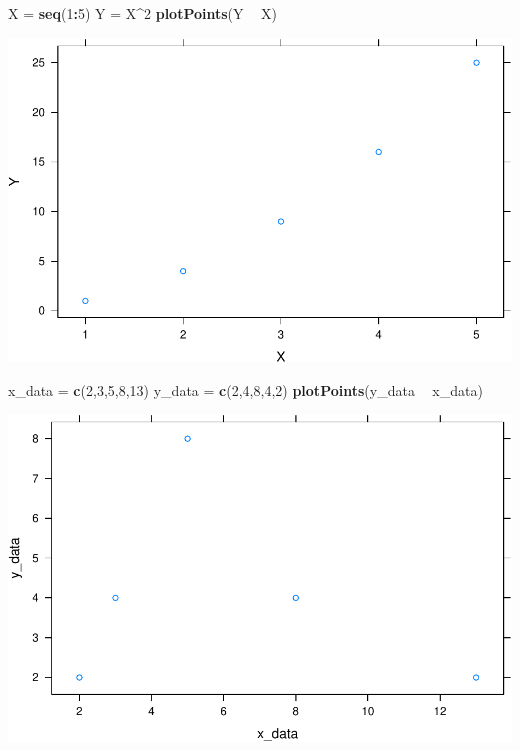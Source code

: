 \documentclass[
]{book}
\newenvironment{Shaded}{\begin{snugshade}}{\end{snugshade}}
\newcommand{\DecValTok}[1]{\textcolor[rgb]{0.00,0.00,0.81}{#1}}
\newcommand{\KeywordTok}[1]{\textcolor[rgb]{0.13,0.29,0.53}{\textbf{#1}}}
\newcommand{\NormalTok}[1]{#1}
\newcommand{\OperatorTok}[1]{\textcolor[rgb]{0.81,0.36,0.00}{\textbf{#1}}}
\newcommand{\StringTok}[1]{\textcolor[rgb]{0.31,0.60,0.02}{#1}}
\begin{document}
\begin{Shaded}
\begin{Highlighting}[]
\NormalTok{X =}\StringTok{ }\KeywordTok{seq}\NormalTok{(}\DecValTok{1}\OperatorTok{:}\DecValTok{5}\NormalTok{)}
\NormalTok{Y =}\StringTok{ }\NormalTok{X}\OperatorTok{^}\DecValTok{2}
\KeywordTok{plotPoints}\NormalTok{(Y }\OperatorTok{~}\StringTok{ }\NormalTok{X)}
\end{Highlighting}
\end{Shaded}

\includegraphics{_bookdown_files/math135_handbook_files/figure-latex/unnamed-chunk-28-1.pdf}

\begin{Shaded}
\begin{Highlighting}[]
\NormalTok{x_data =}\StringTok{ }\KeywordTok{c}\NormalTok{(}\DecValTok{2}\NormalTok{,}\DecValTok{3}\NormalTok{,}\DecValTok{5}\NormalTok{,}\DecValTok{8}\NormalTok{,}\DecValTok{13}\NormalTok{)}
\NormalTok{y_data =}\StringTok{ }\KeywordTok{c}\NormalTok{(}\DecValTok{2}\NormalTok{,}\DecValTok{4}\NormalTok{,}\DecValTok{8}\NormalTok{,}\DecValTok{4}\NormalTok{,}\DecValTok{2}\NormalTok{)}
\KeywordTok{plotPoints}\NormalTok{(y_data }\OperatorTok{~}\StringTok{ }\NormalTok{x_data)}
\end{Highlighting}
\end{Shaded}

\includegraphics{_bookdown_files/math135_handbook_files/figure-latex/unnamed-chunk-29-1.pdf}
\end{document}
